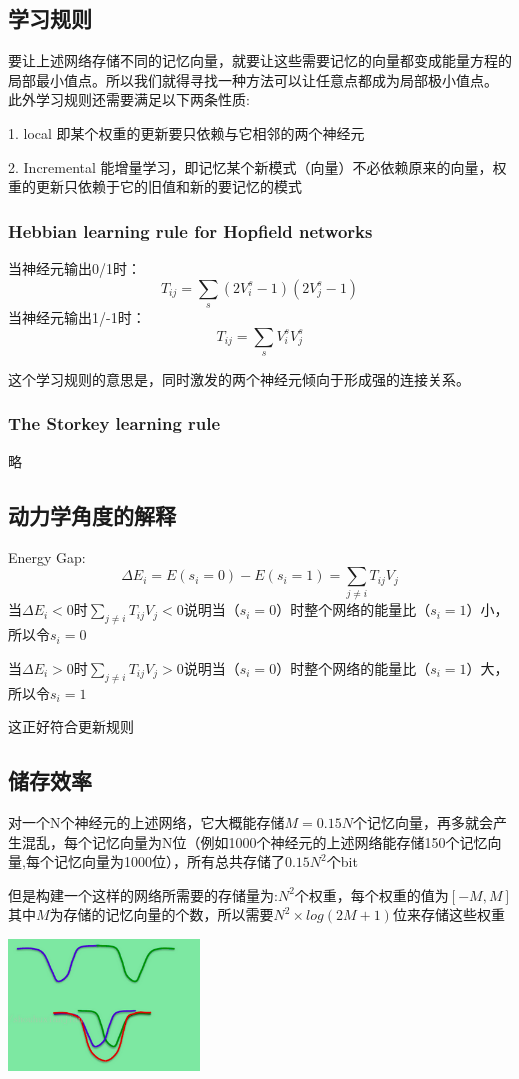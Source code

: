 \documentclass{article} %
\begin{document}
\begin{CJK*}{UTF8}{gkai}
\subsection{学习规则}
要让上述网络存储不同的记忆向量，就要让这些需要记忆的向量都变成能量方程的局部最小值点。所以我们就得寻找一种方法可以让任意点都成为局部极小值点。
此外学习规则还需要满足以下两条性质:

1. local 即某个权重的更新要只依赖与它相邻的两个神经元

2. Incremental 能增量学习，即记忆某个新模式（向量）不必依赖原来的向量，权重的更新只依赖于它的旧值和新的要记忆的模式

\subsubsection{Hebbian learning rule for Hopfield networks}
当神经元输出0/1时：
$$ T _{ij} = \sum _{s}\left(2V _{i}^{s}-1\right) \left(2V _{j}^{s}-1\right)$$
当神经元输出1/-1时：
$$ T _{ij} = \sum _{s}V _{i}^{s} V _{j}^{s}$$

这个学习规则的意思是，同时激发的两个神经元倾向于形成强的连接关系。
\subsubsection{The Storkey learning rule}
略
\subsection{动力学角度的解释}
Energy Gap:
$$ \Delta E _{i} = E\left(s_{i}=0\right)-E\left(s_{i}=1\right)=\sum _{j \neq i} T _{ij} V _{j}$$
当$ \Delta E _{i} < 0$时$\sum _{j \neq i} T _{ij} V _{j} < 0$说明当（$s_{i}=0$）时整个网络的能量比（$s_{i}=1$）小，所以令$s_{i}=0$

当$ \Delta E _{i} > 0$时$\sum _{j \neq i} T _{ij} V _{j} > 0$说明当（$s_{i}=0$）时整个网络的能量比（$s_{i}=1$）大，所以令$s_{i}=1$

这正好符合更新规则
\subsection{储存效率}
对一个N个神经元的上述网络，它大概能存储$M=0.15N$个记忆向量，再多就会产生混乱，每个记忆向量为N位（例如1000个神经元的上述网络能存储150个记忆向量,每个记忆向量为1000位），所有总共存储了$0.15N ^{2}$个bit

但是构建一个这样的网络所需要的存储量为:$N^{2}$个权重，每个权重的值为$[-M, M]$其中$M$为存储的记忆向量的个数，所以需要$N^{2}\times log(2M+1)$位来存储这些权重
\begin{center}
\includegraphics[width=2in]{misrepresentation.png}
\end{center}
\end{CJK*}
\end{document}
